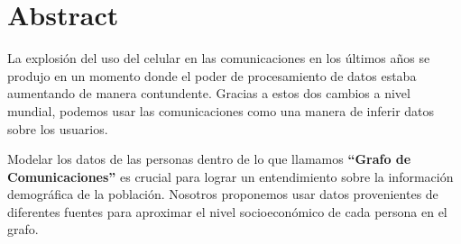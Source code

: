 \documentclass{article}
\begin{document}
\section{Abstract}

La explosi\'on del uso del celular en las comunicaciones en los \'ultimos a\~nos se produjo en un momento donde el poder de procesamiento de datos estaba aumentando de manera contundente. Gracias a estos dos cambios a nivel mundial, podemos usar las comunicaciones como una manera de inferir datos sobre los usuarios.

Modelar los datos de las personas dentro de lo que llamamos \textbf{``Grafo de Comunicaciones''} es crucial para lograr un entendimiento sobre la informaci\'on demogr\'afica de la poblaci\'on. Nosotros proponemos usar datos provenientes de diferentes fuentes para aproximar el nivel socioecon\'omico de cada persona en el grafo.
\end{document}
